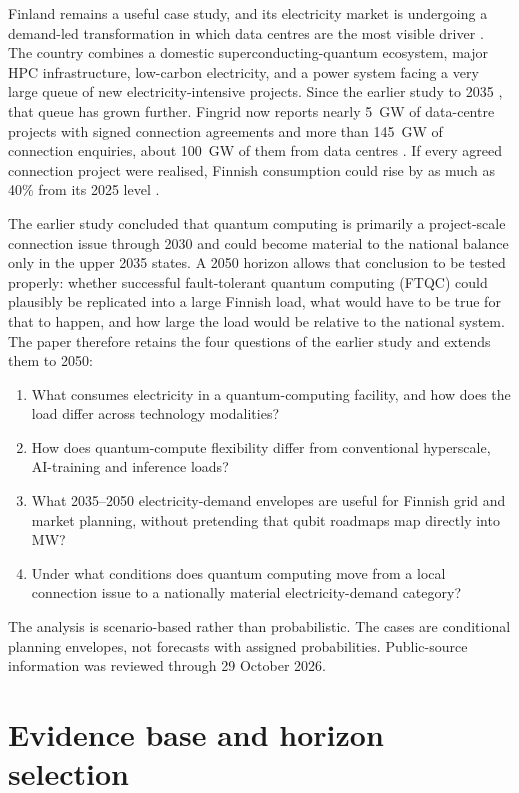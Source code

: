 \documentclass[11pt,a4paper]{article}
\begin{document}
Finland remains a useful case study, and its electricity market is undergoing a demand-led transformation in which data centres are the most visible driver \citep{merilehto2026blog}. The country combines a domestic superconducting-quantum ecosystem, major HPC infrastructure, low-carbon electricity, and a power system facing a very large queue of new electricity-intensive projects. Since the earlier study to 2035 \citep{merilehto2026qc2035}, that queue has grown further. Fingrid now reports nearly 5~GW of data-centre projects with signed connection agreements and more than 145~GW of connection enquiries, about 100~GW of them from data centres \citep{fingrid2026prospects}. If every agreed connection project were realised, Finnish consumption could rise by as much as 40\% from its 2025 level \citep{fingrid2026q3}.

The earlier study concluded that quantum computing is primarily a project-scale connection issue through 2030 and could become material to the national balance only in the upper 2035 states. A 2050 horizon allows that conclusion to be tested properly: whether successful fault-tolerant quantum computing (FTQC) could plausibly be replicated into a large Finnish load, what would have to be true for that to happen, and how large the load would be relative to the national system. The paper therefore retains the four questions of the earlier study and extends them to 2050:
\begin{enumerate}
  \item What consumes electricity in a quantum-computing facility, and how does the load differ across technology modalities?
  \item How does quantum-compute flexibility differ from conventional hyperscale, AI-training and inference loads?
  \item What 2035--2050 electricity-demand envelopes are useful for Finnish grid and market planning, without pretending that qubit roadmaps map directly into MW?
  \item Under what conditions does quantum computing move from a local connection issue to a nationally material electricity-demand category?
\end{enumerate}
The analysis is scenario-based rather than probabilistic. The cases are conditional planning envelopes, not forecasts with assigned probabilities. Public-source information was reviewed through 29 October 2026.

\section{Evidence base and horizon selection}
\end{document}
